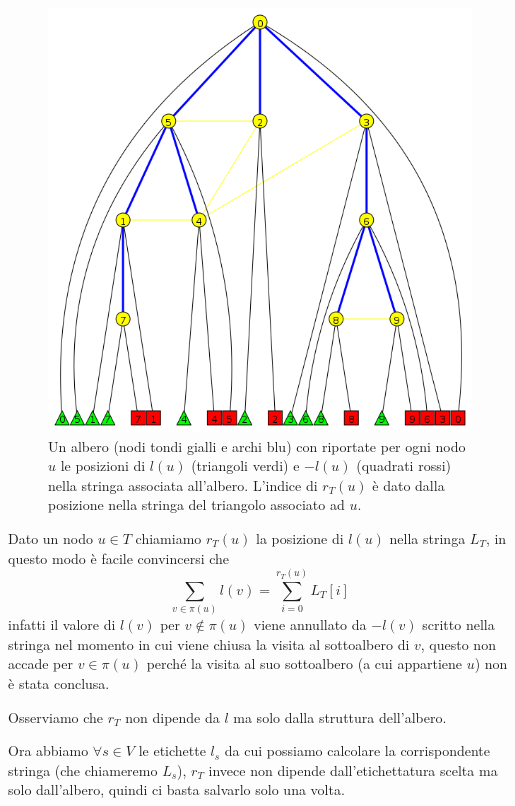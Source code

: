 \documentclass[a4paper,10pt]{amsbook}
\theoremstyle{plain}
\theoremstyle{definition}
\theoremstyle{remark}
\begin{document}
\begin{figure}[h]
  \centering
  \includegraphics[width=1\textwidth]{labeltree}
  \caption{Un albero (nodi tondi gialli e archi blu) con riportate per
    ogni nodo $u$ le posizioni di $l(u)$ (triangoli verdi) e $-l(u)$
    (quadrati rossi) nella stringa associata all'albero. L'indice di
  $r_T(u)$ \`e dato dalla posizione nella stringa del triangolo
  associato ad $u$.}
  \label{fig:labeltree}
\end{figure}


Dato un nodo $u\in T$ chiamiamo $r_T(u)$ la posizione di $l(u)$ nella
stringa $L_T$, in questo modo \`e facile convincersi che 
\[ \sum _{v \in \pi(u)} l(v) = \sum _{i=0} ^
{r_T(u)} L_T[i] \]
infatti il valore di $l(v)$ per $v \not\in \pi(u)$ viene annullato da
$-l(v)$ scritto nella stringa nel momento in cui viene chiusa la
visita al sottoalbero di $v$, questo non accade per $v\in \pi(u)$
perch\'e la visita al suo sottoalbero (a cui appartiene $u$) non \`e
stata conclusa.

Osserviamo che $r_T$ non dipende da $l$ ma solo dalla struttura
dell'albero.

Ora abbiamo $\forall s\in V$ le etichette $l_s$ da cui possiamo
calcolare la corrispondente stringa (che chiameremo $L_s$), $r_T$
invece non dipende dall'etichettatura scelta ma solo dall'albero,
quindi ci basta salvarlo solo una volta.
\end{document}
